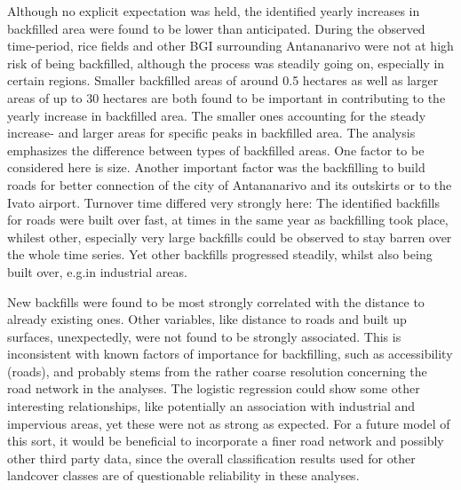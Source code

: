 \documentclass[11pt, A4, oneside]{report}
\begin{document}
Although no explicit expectation was held, the identified yearly increases in backfilled area were found to be lower than anticipated. During the observed time-period, rice fields and other BGI surrounding Antananarivo were not at high risk of being backfilled, although the process was steadily going on, especially in certain regions. Smaller backfilled areas of around 0.5 hectares as well as larger areas of up to 30 hectares are both found to be important in contributing to the yearly increase in backfilled area. The smaller ones accounting for the steady increase- and larger areas for specific peaks in backfilled area. The analysis emphasizes the difference between types of backfilled areas. One factor to be considered here is size. Another important factor was the backfilling to build roads for better connection of the city of Antananarivo and its outskirts or to the Ivato airport. Turnover time differed very strongly here: The identified backfills for roads were built over fast, at times in the same year as backfilling took place, whilest other, especially very large backfills could be observed to stay barren over the whole time series. Yet other backfills progressed steadily, whilst also being built over, e.g.in industrial areas.

New backfills were found to be most strongly correlated with the distance to already existing ones. Other variables, like distance to roads and built up surfaces, unexpectedly, were not found to be strongly associated. This is inconsistent with known factors of importance for backfilling, such as accessibility (roads), and probably stems from the rather coarse resolution concerning the road network in the analyses. The logistic regression could show some other interesting relationships, like potentially an association with industrial and impervious areas, yet these were not as strong as expected. For a future model of this sort, it would be beneficial to incorporate a finer road network and possibly other third party data, since the overall classification results used for other landcover classes are of questionable reliability in these analyses.
\end{document}
